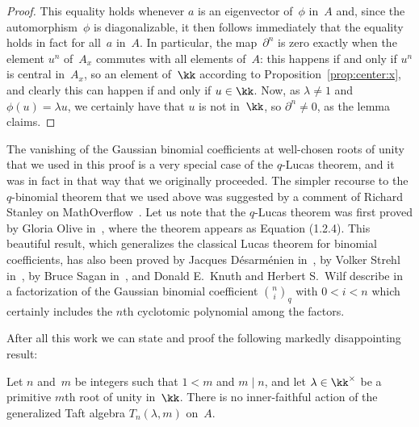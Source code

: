 \begin{proof}
This equality holds whenever $a$ is an eigenvector of~$\phi$ in~$A$ and,
since the automorphism~$\phi$ is diagonalizable, it then follows
immediately that the equality holds in fact for all~$a$ in~$A$. In
particular, the map~$\partial^n$ is zero exactly when the element $u^n$
of~$A_x$ commutes with all elements of~$A$: this happens if and only if
$u^n$ is central in~$A_x$, so an element of~$\kk$ according to
Proposition~\ref{prop:center:x}, and clearly this can happen if and only if
$u\in\kk$. Now, as $\lambda\neq1$ and $\phi(u)=\lambda u$, we certainly
have that $u$ is not in~$\kk$, so $\partial^n\neq0$, as the lemma claims.
\end{proof}

\begin{Remark}
The vanishing of the Gaussian binomial coefficients at well-chosen roots of
unity that we used in this proof is a very special case of the $q$-Lucas
theorem, and it was in fact in that way that we originally proceeded. The
simpler recourse to the $q$-binomial theorem that we used above was
suggested by a comment of Richard Stanley on MathOverflow~\cite{A}. Let
us note that the $q$-Lucas theorem was first proved by Gloria Olive
in~\cite{Olive}, where the theorem appears as Equation (1.2.4). This
beautiful result, which generalizes the classical Lucas theorem for
binomial coefficients, has also been proved by Jacques Désarménien
in~\cite{Desarmenien}, by Volker Strehl in~\cite{Strehl}, by Bruce Sagan
in~\cite{Sagan}, and Donald E.\ Knuth and Herbert S.\ Wilf describe
in~\cite{KnW} a factorization of the Gaussian binomial coefficient
$\binom{n}{i}_q$ with $0<i<n$  which certainly includes the $n$th
cyclotomic polynomial among the factors.
\end{Remark}

After all this work we can state and proof the following markedly
disappointing result:

\begin{Proposition}\label{prop:taft-actions}
Let $n$ and~$m$ be integers such that $1<m$ and $m\mid n$, and let
$\lambda\in\kk^\times$ be a primitive $m$th root of unity in~$\kk$. There
is no inner-faithful action of the generalized Taft algebra
$T_n(\lambda,m)$ on~$A$.
\end{Proposition}


